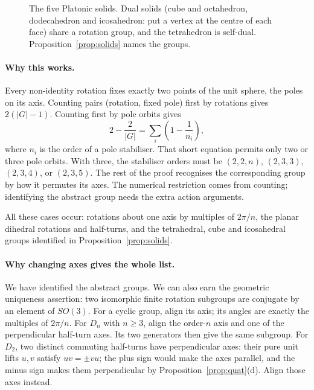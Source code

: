\begin{figure}[ht]
\centering
{}
\caption{The five Platonic solids. Dual solids (cube and octahedron, dodecahedron and icosahedron: put a vertex at the centre of each face) share a rotation group, and the tetrahedron is self-dual. Proposition~\ref{prop:solids} names the groups.}
\label{fig:solids}
\end{figure}

\paragraph{Why this works.}
Every non-identity rotation fixes exactly two points of the unit sphere, the poles on its axis. Counting pairs (rotation, fixed pole) first by rotations gives $2(|G|-1)$. Counting first by pole orbits gives
\[
2-\frac2{|G|}=\sum_i\left(1-\frac1{n_i}\right),
\]
where $n_i$ is the order of a pole stabiliser. That short equation permits only two or three pole orbits. With three, the stabiliser orders must be $(2,2,n)$, $(2,3,3)$, $(2,3,4)$, or $(2,3,5)$. The rest of the proof recognises the corresponding group by how it permutes its axes. The numerical restriction comes from counting; identifying the abstract group needs the extra action arguments.

All these cases occur: rotations about one axis by multiples of $2\pi/n$, the planar dihedral rotations and half-turns, and the tetrahedral, cube and icosahedral groups identified in Proposition~\ref{prop:solids}.

\paragraph{Why changing axes gives the whole list.}
We have identified the abstract groups. We can also earn the geometric
uniqueness assertion: two isomorphic finite rotation subgroups are conjugate
by an element of $SO(3)$.
For a cyclic group, align its axis; its angles are exactly the multiples
of $2\pi/n$. For $D_n$ with $n\ge3$, align the order-$n$ axis and one of
the perpendicular half-turn axes. Its two generators then give the same
subgroup. For $D_2$, two distinct commuting half-turns have perpendicular
axes: their pure unit lifts $u,v$ satisfy $uv=\pm vu$; the plus sign would
make the axes parallel, and the minus sign makes them perpendicular by
Proposition~\ref{prop:quat}(d). Align those axes instead.

